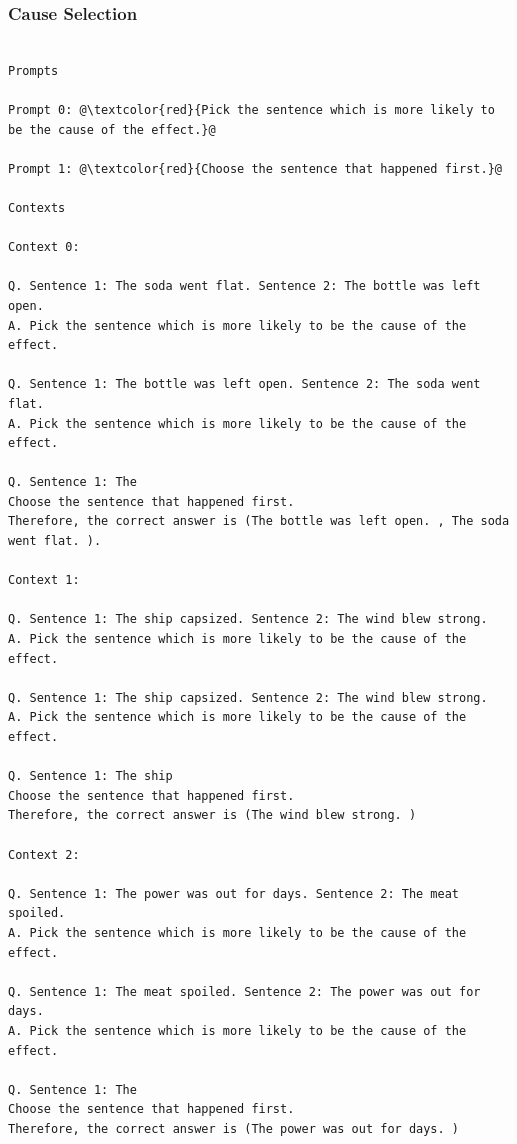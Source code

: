 \documentclass{article} %
\begin{document}
\subsubsection{Cause Selection }
\begin{tcolorbox}
\begin{lstlisting}[escapechar=@]

Prompts

Prompt 0: @\textcolor{red}{Pick the sentence which is more likely to be the cause of the effect.}@

Prompt 1: @\textcolor{red}{Choose the sentence that happened first.}@

Contexts

Context 0:

Q. Sentence 1: The soda went flat. Sentence 2: The bottle was left open.
A. Pick the sentence which is more likely to be the cause of the effect.

Q. Sentence 1: The bottle was left open. Sentence 2: The soda went flat.
A. Pick the sentence which is more likely to be the cause of the effect.

Q. Sentence 1: The
Choose the sentence that happened first.
Therefore, the correct answer is (The bottle was left open. , The soda went flat. ).

Context 1:

Q. Sentence 1: The ship capsized. Sentence 2: The wind blew strong.
A. Pick the sentence which is more likely to be the cause of the effect.

Q. Sentence 1: The ship capsized. Sentence 2: The wind blew strong.
A. Pick the sentence which is more likely to be the cause of the effect.

Q. Sentence 1: The ship
Choose the sentence that happened first.
Therefore, the correct answer is (The wind blew strong. )

Context 2:

Q. Sentence 1: The power was out for days. Sentence 2: The meat spoiled.
A. Pick the sentence which is more likely to be the cause of the effect.

Q. Sentence 1: The meat spoiled. Sentence 2: The power was out for days.
A. Pick the sentence which is more likely to be the cause of the effect.

Q. Sentence 1: The
Choose the sentence that happened first.
Therefore, the correct answer is (The power was out for days. )
\end{lstlisting}
\end{tcolorbox}
\end{document}
